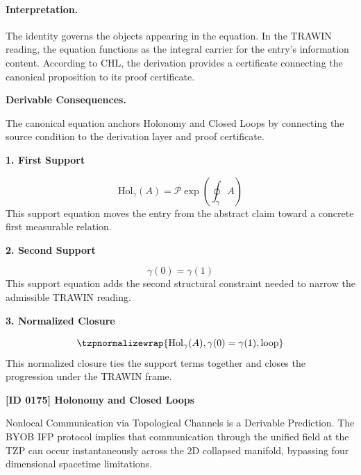 \paragraph{Interpretation.}
The identity governs the objects appearing in the equation. In the TRAWIN reading, the equation functions as the integral carrier for the entry’s information content. According to CHL, the derivation provides a certificate connecting the canonical proposition to its proof certificate.

\par\vspace{0.35em}
\noindent\textbf{Derivable Consequences.}\quad
\begingroup
\footnotesize
\raggedright
The canonical equation anchors Holonomy and Closed Loops by connecting the source condition to the derivation layer and proof certificate.
\par\endgroup

\noindent\textbf{1. First Support}\par
\[
\mathrm{Hol}_\gamma(A)=\mathcal{P}\exp\!\left(\oint_\gamma A\right)
\]
\noindent This support equation moves the entry from the abstract claim toward a concrete first measurable relation.\par
\noindent\textbf{2. Second Support}\par
\[
\gamma(0)=\gamma(1)
\]
\noindent This support equation adds the second structural constraint needed to narrow the admissible TRAWIN reading.\par
\noindent\textbf{3. Normalized Closure}\par
\[
\tzpnormalizewrap{\mathrm{Hol}_\gamma(A),\gamma(0)=\gamma(1),\text{loop}}
\]
\noindent This normalized closure ties the support terms together and closes the progression under the TRAWIN frame.\par

\clearpage
\noindent\textbf{[ID 0175] Holonomy and Closed Loops}\par
\vspace{0.35em}
\begingroup\small
{}
Nonlocal Communication via Topological Channels is a Derivable Prediction. The BYOB IFP protocol implies that communication through the unified field at the TZP can occur instantaneously across the 2D collapsed manifold, bypassing four dimensional spacetime limitations.  


